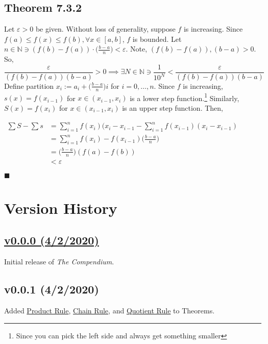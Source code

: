 \documentclass[11pt]{book}
\newcommand{\N}{\mathbb{N}}
\newcommand{\QED}{\begin{flushright}$\blacksquare$\end{flushright}}
\begin{document}
		\subsection{Theorem 7.3.2}
		\label{subsec:theor732}
			\begin{theor}
				Let $\varepsilon > 0$ be given. Without loss of generality, suppose $f$ is increasing. Since $f(a) \leq f(x) \leq f(b), \forall x  \in [a,b]$, $f$ is bounded. 
				Let $n \in \N \ni (f(b) - f(a)) \cdot \big(\frac{b-a}{n}\big) < \varepsilon$. Note, $(f(b) - f(a)), (b-a) > 0$. So, 
				$$\frac{\varepsilon}{(f(b) - f(a))(b-a)} > 0 \implies \exists N \in \N \ni \frac{1}{10^N} <  \frac{\varepsilon}{(f(b) - f(a))(b-a)}$$
				Define partition $x_i := a_i + \big(\frac{b-a}{n}\big)i$ for $i = 0,\dots,n$. Since $f$ is increasing, $s(x) = f(x_{i-1})$ for $x \in (x_{i-1},x_i)$ is a lower step
				function.\footnote{Since you can pick the left side and always get something smaller} Similarly, $S(x) = f(x_i)$ for $x \in (x_{i-1}, x_i)$ is an upper step function.
				Then, 
					\begin{center}
						\begin{math}
							\begin{aligned}
								\sum{S} - \sum{s} & = \sum_{i = 1}^n{f(x_i)(x_i - x_{i-1}} - \sum_{i = 1}^n{f(x_{i-1})(x_i-x_{i-1})}\\
								& = \sum_{i=1}^n{f(x_i) - f(x_{i-1})\big(\frac{b-a}{n}\big)}\\
								& = \bigg(\frac{b-a}{n}\bigg)(f(a) - f(b))\\
								& < \varepsilon
							\end{aligned}
						\end{math}
					\end{center}
				\QED

			\end{theor}
						
\newpage
\section{Version History}
	\subsection{\href{https://www.overleaf.com/read/gyqrjdfnjyvb}{v0.0.0 (4/2/2020)}}
		Initial release of \emph{The Compendium}. 		
	\subsection{v0.0.1 (4/2/2020)}
		Added \hyperref[subsec:productrule]{Product Rule}, \hyperref[subsec:chainrule]{Chain Rule}, and \hyperref[subsec:quotientrule]{Quotient Rule} to Theorems.
\end{document}

